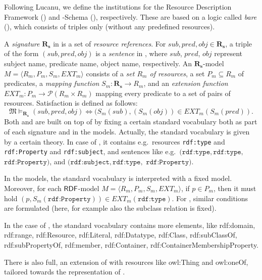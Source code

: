 \documentclass[10pt,%
\ifpretendfinal
final%
\else
draft%
\fi,
]{scrreprt}
\newcommand{\bref}[1]{[\ref{#1}]}
\renewcommand{\bref}[1]{#1}
\begin{document}
\begin{definition}
Following \bref{Lucanu}, 
we define the institutions for the Resource Description
Framework (\RDF) and \RDF-Schema (\RDFS), respectively. 
These are based on a logic called \emph{bare} \RDF (\SimpleRDF), which consists
of triples only (without any predefined resources).

A \textit{signature} $\mathbf{R_s}$ in \SimpleRDF is a set of
\textit{resource references}. For $sub, pred, obj \in \mathbf{R_s}$, a
triple of the form $(sub, pred, obj)$ is a \textit{sentence} in \SimpleRDF,
where $sub$, $pred$, $obj$ represent subject name, predicate name,
object name, respectively. An $\mathbf{R_s}$-model $M =
\langle R_m, P_m, S_m, EXT_m \rangle$ consists of a \textit{set $R_m$
  of resources}, a set $P_m \subseteq R_m$ of predicates, a
\textit{mapping function} $S_m:\mathbf{R_s} \rightarrow R_m$, and an
\textit{extension function} $EXT_m: P_m \rightarrow \mathcal{P}(R_m
\times R_m)$ mapping every predicate to a set of pairs of
resources. Satisfaction is defined as follows:
%
\[\mathfrak{M} \models_{\mathbf{R_s}} (sub, pred, obj) \Leftrightarrow (S_{m}(sub),
(S_{m}(obj)) \in EXT_{m} (S_m(pred)). \]
%
Both \RDF and \RDFS are built on top of \SimpleRDF by fixing a certain
standard vocabulary both as part of each signature and in the models.
Actually, the standard vocabulary is given by a certain theory. In case
of \RDF, it contains e.g.\ resources \texttt{rdf:type} and
\texttt{rdf:Property} and \texttt{rdf:subject}, and sentences like e.g.\
$(\texttt{rdf:type},\texttt{rdf:type},$ $ \texttt{rdf:Property})$, and $(\texttt{rdf:subject}, \texttt{rdf:type},$  $\texttt{rdf:Property})$.

In the models, the standard vocabulary is interpreted with a fixed
model.  Moreover, for each $\mathsf{RDF}$-model $M = \langle R_m, P_m, S_m,
EXT_m \rangle$, if $p\in P_m$, then it must hold
$(p,S_m(\texttt{rdf:Property}))\in EXT_m(\texttt{rdf:type})$.
For \RDFS, similar conditions are formulated (here, for example also
the subclass relation is fixed).


In the case of \RDFS, the standard vocabulary contains more elements,
like
rdf:domain,
rdf:range, rdf:Resource, rdf:Literal, rdf:Datatype, rdf:Class,
rdf:subClassOf, rdf:subPropertyOf, rdf:member, rdf:Container,
rdf:ContainerMembershipProperty.

There is also \OWL full, an extension of \RDFS with resources
like owl:Thing and owl:oneOf, tailored towards the representation of
\OWL.

\end{definition}
\end{document}
